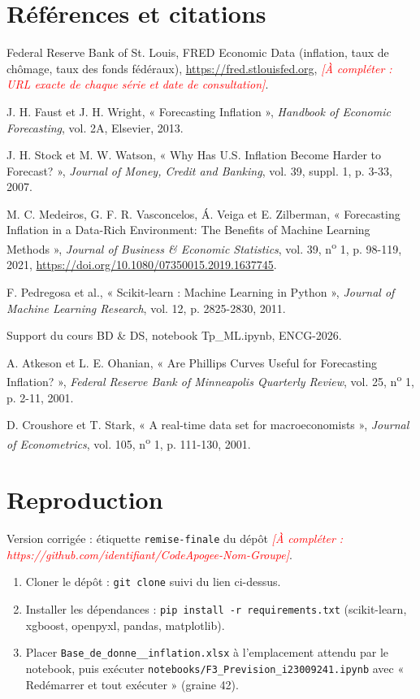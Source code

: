 \documentclass[11pt,a4paper]{article}
\newcommand{\todo}[1]{\textcolor{red}{\textit{[À compléter : #1]}}}
\begin{document}
\section*{Références et citations}
\begin{description}\setlength{\itemsep}{2pt}
\item[{[1]}] Federal Reserve Bank of St. Louis, FRED Economic Data (inflation, taux de chômage, taux des fonds fédéraux), \url{https://fred.stlouisfed.org}, \todo{URL exacte de chaque série et date de consultation}.
\item[{[2]}] J. H. Faust et J. H. Wright, « Forecasting Inflation », \textit{Handbook of Economic Forecasting}, vol. 2A, Elsevier, 2013.
\item[{[3]}] J. H. Stock et M. W. Watson, « Why Has U.S. Inflation Become Harder to Forecast? », \textit{Journal of Money, Credit and Banking}, vol. 39, suppl. 1, p. 3-33, 2007.
\item[{[4]}] M. C. Medeiros, G. F. R. Vasconcelos, Á. Veiga et E. Zilberman, « Forecasting Inflation in a Data-Rich Environment: The Benefits of Machine Learning Methods », \textit{Journal of Business \& Economic Statistics}, vol. 39, n\textsuperscript{o} 1, p. 98-119, 2021, \url{https://doi.org/10.1080/07350015.2019.1637745}.
\item[{[5]}] F. Pedregosa et al., « Scikit-learn : Machine Learning in Python », \textit{Journal of Machine Learning Research}, vol. 12, p. 2825-2830, 2011.
\item[{[6]}] Support du cours BD \& DS, notebook Tp\_ML.ipynb, ENCG-2026.
\item[{[7]}] A. Atkeson et L. E. Ohanian, « Are Phillips Curves Useful for Forecasting Inflation? », \textit{Federal Reserve Bank of Minneapolis Quarterly Review}, vol. 25, n\textsuperscript{o} 1, p. 2-11, 2001.
\item[{[8]}] D. Croushore et T. Stark, « A real-time data set for macroeconomists », \textit{Journal of Econometrics}, vol. 105, n\textsuperscript{o} 1, p. 111-130, 2001.
\end{description}

\appendix
\section{Reproduction}
Version corrigée : étiquette \texttt{remise-finale} du dépôt \todo{https://github.com/identifiant/CodeApogee-Nom-Groupe}.
\begin{enumerate}
\item Cloner le dépôt : \texttt{git clone} suivi du lien ci-dessus.
\item Installer les dépendances : \texttt{pip install -r requirements.txt} (scikit-learn, xgboost, openpyxl, pandas, matplotlib).
\item Placer \texttt{Base\_de\_donne\_\_inflation.xlsx} à l'emplacement attendu par le notebook, puis exécuter \texttt{notebooks/F3\_Prevision\_i23009241.ipynb} avec « Redémarrer et tout exécuter » (graine 42).
\end{enumerate}
\end{document}
